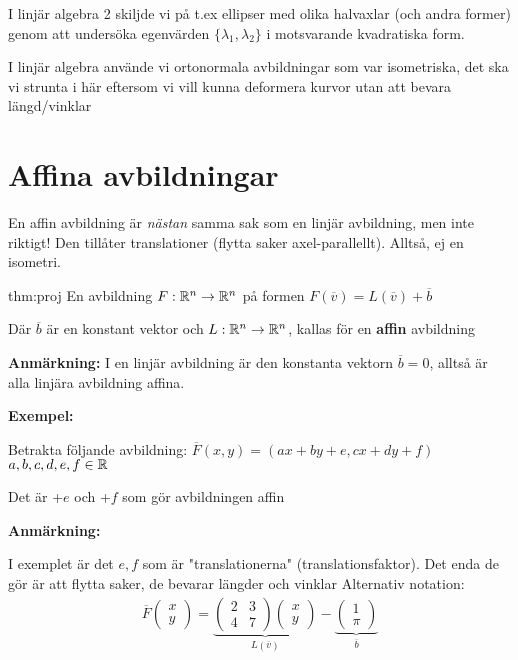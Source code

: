\noindent I linjär algebra 2 skiljde vi på t.ex ellipser med olika halvaxlar (och andra former) genom att undersöka egenvärden $\{\lambda_1, \lambda_2\}$ i motsvarande kvadratiska form.\par
\noindent I linjär algebra använde vi ortonormala avbildningar som var isometriska, det ska vi strunta i här eftersom vi vill kunna deformera kurvor utan att bevara längd/vinklar
\par\bigskip
\section{Affina avbildningar}
\par\bigskip
\noindent En affin avbildning är \textit{nästan} samma sak som en linjär avbildning, men inte riktigt! Den tillåter translationer (flytta saker axel-parallellt). Alltså, ej en isometri.
\par\bigskip
\begin{theo}{thm:proj}
  En avbildning $F:\mathbb{R}^n\to\mathbb{R}^n$ på formen $F(\overline{v}) = L(\overline{v})+\overline{b}$\par
  \noindent Där $\overline{b}$ är en konstant vektor och $L:\mathbb{R}^n\to\mathbb{R}^n$, kallas för en \textbf{affin} avbildning
\end{theo}
\par\bigskip
\noindent\textbf{Anmärkning:}
\noindent I en linjär avbildning är den konstanta vektorn $\overline{b} = 0$, alltså är alla linjära avbildning affina.
\par\bigskip
\noindent\textbf{Exempel:}\par
\noindent Betrakta följande avbildning: $\overline{F}(x,y) = (ax+by+e, cx+dy+f)$ $a,b,c,d,e,f\in\mathbb{R}$\par
\noindent Det är +$e$ och +$f$ som gör avbildningen affin\par
\par\bigskip
\noindent\textbf{Anmärkning:}\par
\noindent I exemplet är det $e,f$ som är "translationerna" (translationsfaktor). Det enda de gör är att flytta saker, de bevarar längder och vinklar
\noindent Alternativ notation:
\begin{equation*}
  \begin{gathered}
    \overline{F}\begin{pmatrix}x\\y\end{pmatrix} = \underbrace{\begin{pmatrix}2&3\\4&7\end{pmatrix}\begin{pmatrix}x\\y\end{pmatrix}}_{\text{$L(\overline{v})$}}-\underbrace{\begin{pmatrix}1\\\pi\end{pmatrix}}_{\text{$\overline{b}$}}
  \end{gathered}
\end{equation*}
